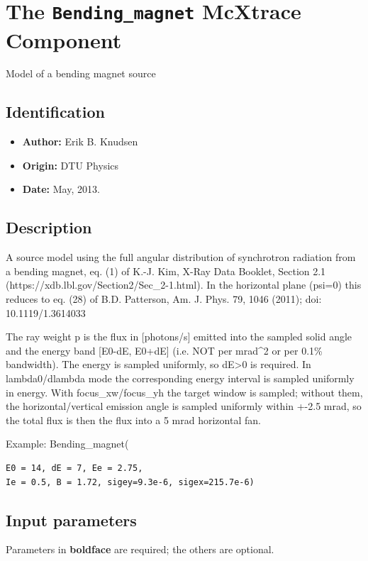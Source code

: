 \section{The \texttt{Bending\_magnet} McXtrace Component}
Model of a bending magnet source

\subsection*{Identification}
\begin{itemize}
  \item \textbf{Author:} Erik B. Knudsen
  \item \textbf{Origin:} DTU Physics
  \item \textbf{Date:} May, 2013.
\end{itemize}

\subsection*{Description}
A source model using the full angular distribution of synchrotron radiation from a bending magnet, eq. (1) of K.-J. Kim, X-Ray Data Booklet, Section 2.1 (https://xdb.lbl.gov/Section2/Sec\_2-1.html). In the horizontal plane (psi=0) this reduces to eq. (28) of B.D. Patterson, Am. J. Phys. 79, 1046 (2011); doi: 10.1119/1.3614033

The ray weight p is the flux in [photons/s] emitted into the sampled solid angle and the energy band [E0-dE, E0+dE] (i.e. NOT per mrad\textasciicircum{}2 or per 0.1\% bandwidth). The energy is sampled uniformly, so dE\textgreater{}0 is required. In lambda0/dlambda mode the corresponding energy interval is sampled uniformly in energy. With focus\_xw/focus\_yh the target window is sampled; without them, the horizontal/vertical emission angle is sampled uniformly within +-2.5 mrad, so the total flux is then the flux into a 5 mrad horizontal fan.

Example: Bending\_magnet(

\begin{verbatim}
E0 = 14, dE = 7, Ee = 2.75,
Ie = 0.5, B = 1.72, sigey=9.3e-6, sigex=215.7e-6)
\end{verbatim}

\subsection*{Input parameters}
Parameters in \textbf{boldface} are required; the others are optional.

